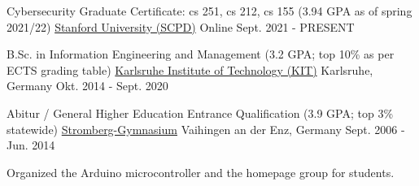 

\begin{cventries}

  \cventry
    {Cybersecurity Graduate Certificate: cs 251, cs 212, cs 155 (3.94 GPA as of spring 2021/22)} %
    {\href{https://online.stanford.edu/programs/cybersecurity-graduate-program}{Stanford University (SCPD)} } %
    {Online} %
    {Sept. 2021 - PRESENT} %
    {}

  \cventry
    {B.Sc. in Information Engineering and Management (3.2 GPA; top 10\% as per ECTS grading table)} %
    {\href{https://www.sle.kit.edu/english/vorstudium/bachelor-information-engineering-management.php}{Karlsruhe Institute of Technology (KIT)} } %
    {Karlsruhe, Germany} %
    {Okt. 2014 - Sept. 2020} %
    {}
  
  \cventry
    {Abitur / General Higher Education Entrance Qualification  (3.9 GPA; top 3\% statewide)} %
    {\href{https://www.stromberg-gymnasium.de/?page_id=113}{Stromberg-Gymnasium}} %
    {Vaihingen an der Enz, Germany} %
    {Sept. 2006 - Jun. 2014} %
    {
      \begin{cvitems} %
        \item {Organized the Arduino microcontroller and the homepage group for students.}
      \end{cvitems}
    }

\end{cventries}
